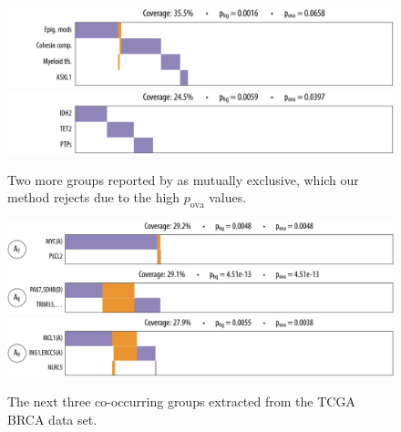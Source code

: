 \begin{figure}[htbp]
\centering
\includegraphics[width=\textwidth]{figures/genes/aml_comet1.pdf}\\[2em]
\includegraphics[width=\textwidth]{figures/genes/aml_comet2.pdf}\\[2em]
\caption{Two more groups reported by \comet as mutually exclusive, which our method rejects due to the high $p_{\textrm{ova}}$ values.}
\label{fig:comet_aml}
\end{figure}
\vspace{3em}
\begin{figure}[htbp]
\centering
\includegraphics[width=\textwidth]{figures/genes/brca_9_a.pdf}\\[1.2em]
\includegraphics[width=\textwidth]{figures/genes/brca_13_a.pdf}\\[1.2em]
\includegraphics[width=\textwidth]{figures/genes/brca_5_a.pdf}\\[1.2em]
\caption{The next three co-occurring groups extracted from the TCGA BRCA data set.}
\label{fig:att_brca_2}
\end{figure}

